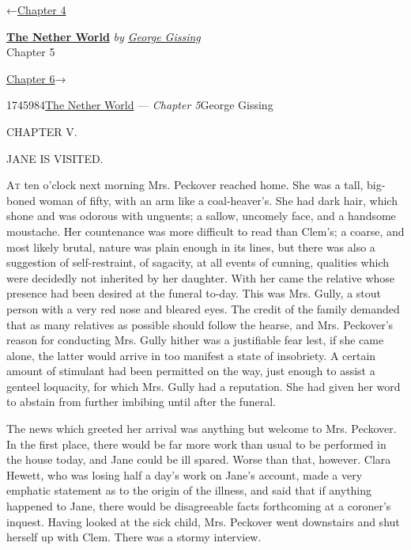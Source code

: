 \hypertarget{headerContainer}{}
\hypertarget{navigationHeader}{}
\protect\hypertarget{headerprevious}{}{←\href{/wiki/The_Nether_World/Volume_1/Chapter_4}{Chapter
4}}

\textbf{\protect\hypertarget{header_title_text}{}{\href{/wiki/The_Nether_World}{The
Nether World}}} \emph{by
\href{/wiki/Author:George_Gissing}{\protect\hypertarget{header_author_text}{}{{George
Gissing}}}}\\
\protect\hypertarget{header_section_text}{}{Chapter 5}

\protect\hypertarget{headernext}{}{\href{/wiki/The_Nether_World/Volume_1/Chapter_6}{Chapter
6}→}

\hypertarget{navigationNotes}{}

\hypertarget{ws-data}{}
\protect\hypertarget{ws-article-id}{}{1745984}\protect\hypertarget{ws-title}{}{\href{/wiki/The_Nether_World}{The
Nether World} --- \emph{Chapter
5}}\protect\hypertarget{ws-author}{}{George Gissing}

{\protect\hypertarget{92}{}{}}

{CHAPTER V.}

JANE IS VISITED.

\textsc{At} ten o'clock next morning Mrs. Peckover reached home. She was
a tall, big-boned woman of fifty, with an arm like a coal-heaver's. She
had dark hair, which shone and was odorous with unguents; a sallow,
uncomely face, and a handsome moustache. Her countenance was more
difficult to read than Clem's; a coarse, and most likely brutal, nature
was plain enough in its lines, but there was also a suggestion of
self-restraint, of sagacity, at all events of cunning, qualities which
were decidedly not inherited by her daughter. With her came the relative
whose presence had been desired at the funeral to-day. This was Mrs.
Gully, a stout person with a very red nose and bleared eyes. The
{\protect\hypertarget{93}{}{}}credit of the family demanded that as many
relatives as possible should follow the hearse, and Mrs. Peckover's
reason for conducting Mrs. Gully hither was a justifiable fear lest, if
she came alone, the latter would arrive in too manifest a state of
insobriety. A certain amount of stimulant had been permitted on the way,
just enough to assist a genteel loquacity, for which Mrs. Gully had a
reputation. She had given her word to abstain from further imbibing
until after the funeral.

The news which greeted her arrival was anything but welcome to Mrs.
Peckover. In the first place, there would be far more work than usual to
be performed in the house today, and Jane could be ill spared. Worse
than that, however. Clara Hewett, who was losing half a day's work on
Jane's account, made a very emphatic statement as to the origin of the
illness, and said that if anything happened to Jane, there would be
disagreeable facts forthcoming at a coroner's inquest. Having looked at
the sick child, Mrs. Peckover went downstairs and shut
{\protect\hypertarget{94}{}{}}herself up with Clem. There was a stormy
interview.

